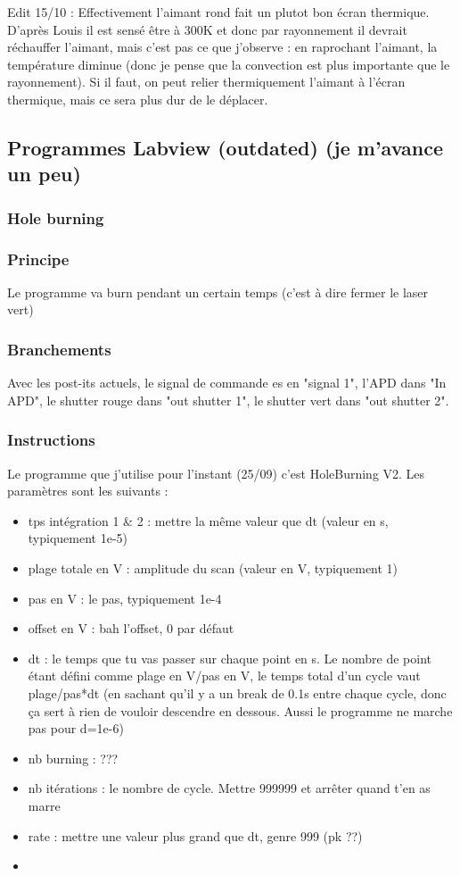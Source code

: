\documentclass[a4paper]{report}
\begin{document}
  Edit 15/10 : Effectivement l'aimant rond fait un plutot bon écran thermique. D'après Louis il est sensé être à 300K et donc par rayonnement il devrait réchauffer l'aimant, mais c'est pas ce que j'observe : en raprochant l'aimant, la température diminue (donc je pense que la convection est plus importante que le rayonnement). Si il faut, on peut relier thermiquement l'aimant à l'écran thermique, mais ce sera plus dur de le déplacer.
  
  \subsection{Programmes Labview (outdated) (je m'avance un peu)}
  \subsubsection{Hole burning}
  \subsubsection{Principe}
  Le programme va burn pendant un certain temps (c'est à dire fermer le laser vert)
  \subsubsection{Branchements}
  Avec les post-its actuels, le signal de commande es en "signal 1", l'APD dans "In APD", le shutter rouge dans "out shutter 1", le shutter vert dans "out shutter 2".
  \subsubsection{Instructions}
  Le programme que j'utilise pour l'instant (25/09) c'est HoleBurning V2. Les paramètres sont les suivants : \begin{itemize}
  \item tps intégration 1 \& 2 : mettre la même valeur que dt (valeur en s, typiquement 1e-5)
  \item plage totale en V : amplitude du scan (valeur en V, typiquement 1)
  \item pas en V : le pas, typiquement 1e-4
  \item offset en V : bah l'offset, 0 par défaut
  \item dt : le temps que tu vas passer sur chaque point en s. Le nombre de point étant défini comme plage en V/pas en V, le temps total d'un cycle vaut plage/pas*dt (en sachant qu'il y a un break de 0.1s entre chaque cycle, donc ça sert à rien de vouloir descendre en dessous. Aussi le programme ne marche pas pour d=1e-6)
  \item nb burning : ???
  \item nb itérations : le nombre de cycle. Mettre 999999 et arrêter quand t'en as marre
  \item rate : mettre une valeur plus grand que dt, genre 999 (pk ??)
  \item 
  \end{itemize}
 
  
\end{document}
